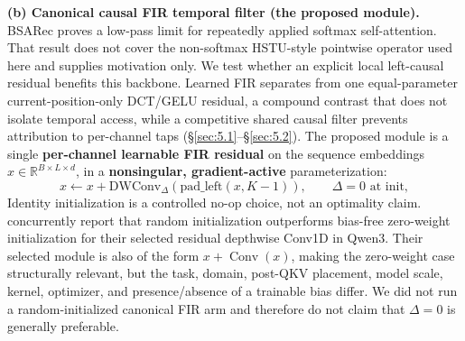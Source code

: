 \textbf{(b) Canonical causal FIR temporal filter (the proposed module).} BSARec \citep[Theorem 1]{shin2024bsarec} proves a low-pass limit for repeatedly applied softmax self-attention. That result does not cover the non-softmax HSTU-style pointwise operator used here and supplies motivation only. We test whether an explicit local left-causal residual benefits this backbone. Learned FIR separates from one equal-parameter current-position-only DCT/GELU residual, a compound contrast that does not isolate temporal access, while a competitive shared causal filter prevents attribution to per-channel taps (\S\ref{sec:5.1}--\S\ref{sec:5.2}). The proposed module is a single \textbf{per-channel learnable FIR residual} on the sequence embeddings $x \in \mathbb{R}^{B\times L\times d}$, in a \textbf{nonsingular, gradient-active} parameterization:
\begin{equation*}
  x \leftarrow x + \mathrm{DWConv}_{\Delta}(\mathrm{pad\_left}(x, K{-}1)), \qquad \Delta = 0 \text{ at init},
\end{equation*}
Identity initialization is a controlled no-op choice, not an optimality claim. \citet{tian2026convllm} concurrently report that random initialization outperforms bias-free zero-weight initialization for their selected residual depthwise Conv1D in Qwen3. Their selected module is also of the form $x+\operatorname{Conv}(x)$, making the zero-weight case structurally relevant, but the task, domain, post-QKV placement, model scale, kernel, optimizer, and presence/absence of a trainable bias differ. We did not run a random-initialized canonical FIR arm and therefore do not claim that $\Delta=0$ is generally preferable.

